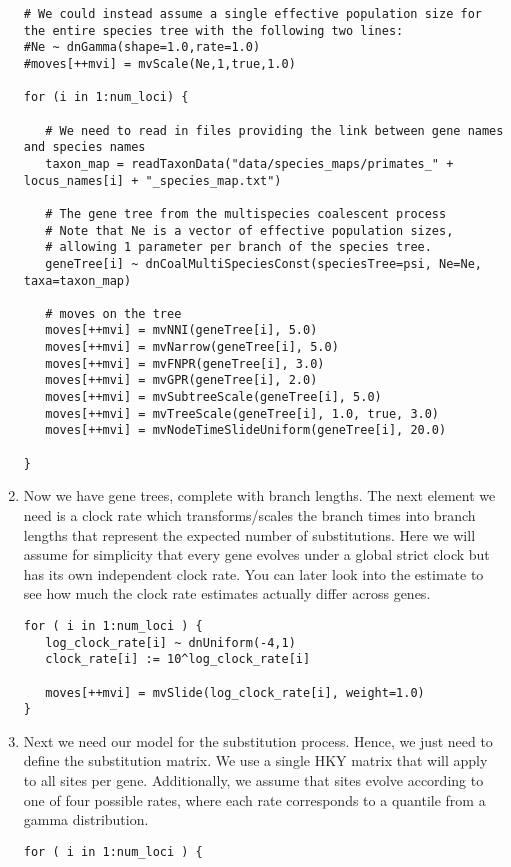 \begin{enumerate}
{\begin{snugshade*}
\begin{lstlisting}
# We could instead assume a single effective population size for the entire species tree with the following two lines:
#Ne ~ dnGamma(shape=1.0,rate=1.0)
#moves[++mvi] = mvScale(Ne,1,true,1.0)

for (i in 1:num_loci) {

   # We need to read in files providing the link between gene names and species names
   taxon_map = readTaxonData("data/species_maps/primates_" + locus_names[i] + "_species_map.txt")

   # The gene tree from the multispecies coalescent process
   # Note that Ne is a vector of effective population sizes, 
   # allowing 1 parameter per branch of the species tree.
   geneTree[i] ~ dnCoalMultiSpeciesConst(speciesTree=psi, Ne=Ne, taxa=taxon_map)

   # moves on the tree
   moves[++mvi] = mvNNI(geneTree[i], 5.0)
   moves[++mvi] = mvNarrow(geneTree[i], 5.0)
   moves[++mvi] = mvFNPR(geneTree[i], 3.0)
   moves[++mvi] = mvGPR(geneTree[i], 2.0)
   moves[++mvi] = mvSubtreeScale(geneTree[i], 5.0)
   moves[++mvi] = mvTreeScale(geneTree[i], 1.0, true, 3.0)
   moves[++mvi] = mvNodeTimeSlideUniform(geneTree[i], 20.0)

}

\end{lstlisting}
\end{snugshade*}}

\item Now we have gene trees, complete with branch lengths. 
The next element we need is a clock rate which transforms/scales the branch times into branch lengths that represent the expected number of substitutions.
Here we will assume for simplicity that every gene evolves under a global strict clock but has its own independent clock rate.
You can later look into the estimate to see how much the clock rate estimates actually differ across genes.
{\tt \begin{snugshade*}
\begin{lstlisting}
for ( i in 1:num_loci ) { 
   log_clock_rate[i] ~ dnUniform(-4,1)
   clock_rate[i] := 10^log_clock_rate[i]
   
   moves[++mvi] = mvSlide(log_clock_rate[i], weight=1.0)
}
\end{lstlisting}
\end{snugshade*}}

\item Next we need our model for the substitution process. 
Hence, we just need to define the substitution matrix. 
We use a single HKY matrix that will apply to all sites per gene.
Additionally, we assume that sites evolve according to one of four possible rates, where each rate corresponds to a quantile from a gamma distribution.
{\tt \begin{snugshade*}
\begin{lstlisting}
for ( i in 1:num_loci ) {


\end{lstlisting}
\end{snugshade*}}
\end{enumerate}
